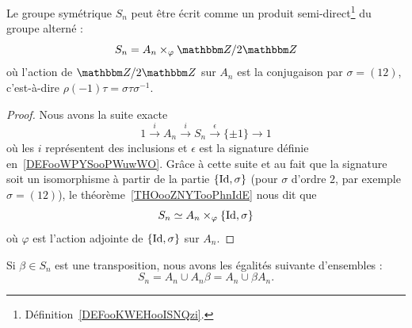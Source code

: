 \begin{proposition}      \label{PROPooPSZVooSmAgPA}
    Le groupe symétrique \( S_n\) peut être écrit comme un produit semi-direct\footnote{Définition~\ref{DEFooKWEHooISNQzi}.} du groupe alterné :
    \begin{equation}
        S_n=A_n\times_{\varphi}\eZ/2\eZ
    \end{equation}
    où l'action de \( \eZ/2\eZ\) sur \( A_n\) est la conjugaison par \( \sigma=(12)\), c'est-à-dire \( \rho(-1)\tau=\sigma\tau\sigma^{-1}\).
\end{proposition}

\begin{proof}
    Nous avons la suite exacte
    \begin{equation}
        1\stackrel{i}{\longrightarrow}A_n\stackrel{i}{\longrightarrow}S_n\stackrel{\epsilon}{\longrightarrow}\{ \pm 1 \}\longrightarrow 1
    \end{equation}
    où les \( i\) représentent des inclusions et \( \epsilon\) est la signature définie en~\ref{DEFooWPYSooPWuwWO}. Grâce à cette suite et au fait que la signature soit un isomorphisme à partir de la partie \( \{ \operatorname{Id},\sigma \}\) (pour \( \sigma\) d'ordre \( 2\), par exemple \( \sigma=(12)\)), le théorème~\ref{THOooZNYTooPhnIdE} nous dit que
    \begin{equation}
        S_n\simeq A_n\times_{\varphi}\{ \operatorname{Id},\sigma \}
    \end{equation}
    où \( \varphi\) est l'action adjointe de \( \{ \operatorname{Id},\sigma \}\) sur \( A_n\).
\end{proof}

\begin{proposition}     \label{PROPooZOWBooIMxxlj}
    Si \( \beta\in S_n\) est une transposition, nous avons les égalités suivante d'ensembles :
    \begin{equation}
        S_n=A_n\cup A_n\beta=A_n\cup \beta A_n.
    \end{equation}
\end{proposition}

